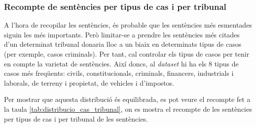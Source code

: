 \subsubsection{Recompte de sentències per tipus de cas i per tribunal}
A l'hora de recopilar les sentències, és probable que les sentències més esmentades siguin les més importants. Però limitar-se a prendre les sentències més citades d'un determinat tribunal donaria lloc a un biaix en determinats tipus de casos (per exemple, casos criminals). Per tant, cal controlar els tipus de casos per tenir en compte la varietat de sentències. Així doncs, al \textit{dataset} hi ha els 8 tipus de casos més freqüents: civils, constitucionals, criminals, financers, industrials i laborals, de terreny i propietat, de vehicles i d'impostos.

Per mostrar que aquesta distribució és equilibrada, es pot veure el recompte fet a la taula \ref{tab:distribucio_cas_tribunal}, on es mostra el recompte de les sentències per tipus de cas i per tribunal de les sentències.


